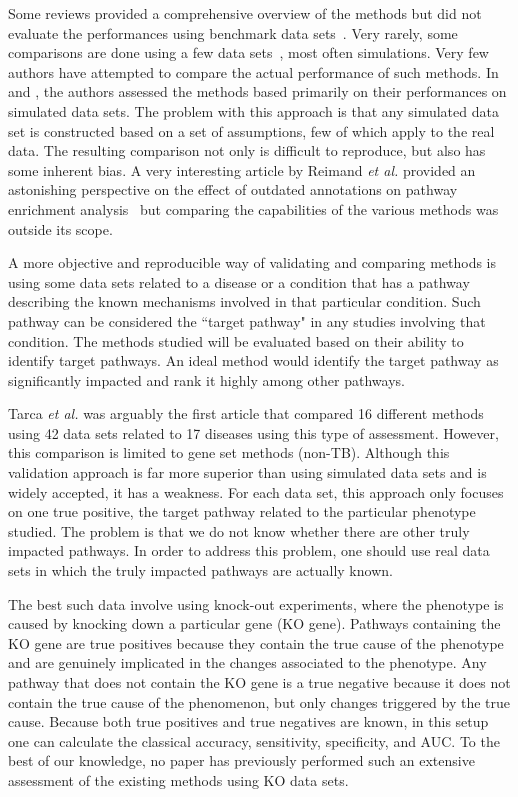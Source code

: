 \documentclass[Minh_PhD_thesis.tex]{subfiles}
\begin{document}
Some reviews provided a comprehensive overview of the methods but did not evaluate the performances using benchmark data sets~\cite{mitrea2013methods, Khatri:2012}. 
%
Very rarely, some comparisons are done using a few data sets~\cite{bayerlova2015comparative}, most often simulations. 
Very few authors have attempted to compare the actual performance of such methods. 
In \cite{bayerlova2015comparative} and \cite{ihnatova2018critical}, the authors assessed the methods based primarily on their performances on simulated data sets.
The problem with this approach is that any simulated data set is constructed based on a set of assumptions, few of which apply to the real data. 
The resulting comparison not only is difficult to reproduce, but also has some inherent bias.
A very interesting article by Reimand \textit{et al.} provided an astonishing perspective on the effect of outdated annotations on pathway enrichment analysis~\cite{Wadi:2016} but comparing the capabilities of the various methods was outside its scope. 



A more objective and reproducible way of validating and comparing methods is using some data sets related to a disease or a condition that has a pathway describing the known mechanisms involved in that particular condition.
Such pathway can be considered the ``target pathway" in any studies involving that condition.
The methods studied will be evaluated based on their ability to identify target pathways. 
An ideal method would identify the target pathway as significantly impacted and rank it highly among other pathways.

Tarca \textit{et al.} \cite{tarca2013comparison} was arguably the first article that compared 16 different  methods using 42 data sets related to 17 diseases using this type of assessment. However, this comparison is limited to gene set methods (non-TB). 
Although this validation approach is far more superior than using simulated data sets and is widely accepted, it has a weakness. For each data set, this approach only focuses on one true positive, the target pathway related to the particular phenotype studied. The problem is that we do not know whether there are other truly impacted pathways. 
In order to address this problem, one should use real data sets in which the truly impacted pathways are actually known. 


The best such data involve using knock-out experiments, where the phenotype is caused by knocking down a particular gene (KO gene). Pathways containing the KO gene are true positives because they contain the true cause of the phenotype and are genuinely implicated in the changes associated to the phenotype. Any pathway that does not contain the KO gene is a true negative because it does not contain the true cause of the phenomenon, but only changes triggered by the true cause. Because both true positives and true negatives are known, in this setup one can calculate the classical  accuracy, sensitivity, specificity, and  AUC. To the best of our knowledge, no paper has previously performed such an extensive assessment of the existing methods using KO data sets.
\end{document}
